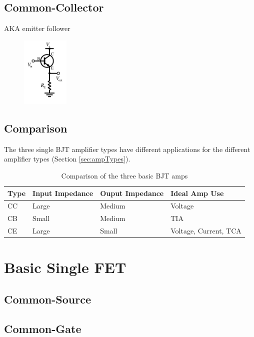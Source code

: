 \documentclass{report}
\newcommand{\imwidth}{0.2\textwidth}
\begin{document}
\section{Common-Collector}
AKA emitter follower
\begin{figure}
\centering
\includegraphics[width = \imwidth]{NPN_common_collector}
\caption{}
\end{figure}

\section{Comparison}
The three single BJT amplifier types have different applications for the different amplifier types (Section \ref{sec:ampTypes}).
\begin{table}
    \centering
    \caption{Comparison of the three basic BJT amps}
    \begin{tabular}{llll}
        \hline\hline
        \textbf{Type} &\textbf{Input Impedance}&\textbf{Ouput Impedance}&\textbf{Ideal Amp Use}\\\hline
        CC & Large & Medium& Voltage\\
        CB & Small & Medium& TIA\\
        CE & Large & Small & Voltage, Current, TCA\\
        \hline\hline
    \end{tabular}
\end{table}

\chapter{Basic Single FET}
\section{Common-Source}
\section{Common-Gate}
\end{document}
